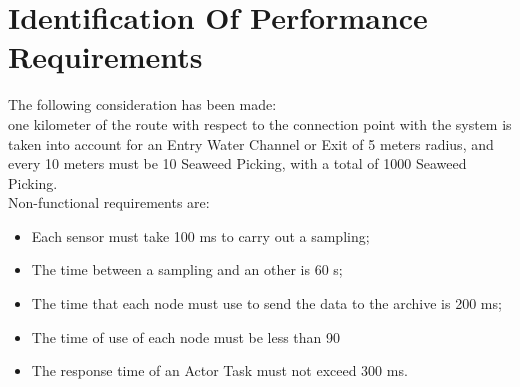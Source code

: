 \chapter{\textbf{Identification Of Performance Requirements}}


The following consideration has been made: \\
one kilometer of the route with respect to the connection point with the system is taken into account for an Entry Water Channel or Exit of 5 meters radius, and every 10 meters must be 10 Seaweed Picking, with a total of 1000 Seaweed Picking. \\
Non-functional requirements are:
\begin{itemize} 
	\item Each sensor must take 100 ms to carry out a sampling;
		\item The time between a sampling and an other is 60 s;
	\item The time that each node must use to send the data to the 				archive	is 200 ms;
	\item The time of use of each node must be less than 90%
	\item The response time of an Actor Task must not exceed 300 ms.
\end{itemize} 
